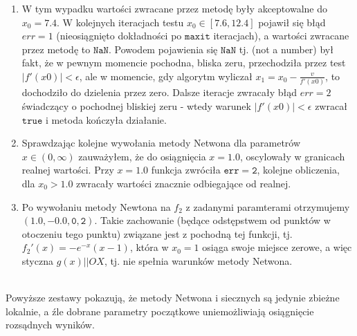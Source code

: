 \begin{enumerate}
  \item W tym wypadku wartości zwracane przez metodę były akceptowalne do $ x_0 = 7.4 $. W kolejnych iteracjach testu $x_0 \in [7.6, 12.4] $ pojawił się błąd $ err = 1 $ (nieosiągnięto dokładności po $\mathtt{maxit}$ iteracjach), a wartości zwracane przez metodę to $ \mathtt{NaN} $. Powodem pojawienia się $ \mathtt{NaN} $ tj. (not a number) był fakt, że w pewnym momencie pochodna, bliska zeru, przechodziła przez test $|f'(x0)| < \epsilon $, ale w momencie, gdy algorytm wyliczał $ x_1 = x_0 - \frac{v}{f'(x0)} $, to dochodziło do dzielenia przez zero. Dalsze iteracje zwracały błąd $ err = 2$ świadczący o pochodnej bliskiej zeru - wtedy warunek $|f'(x0)| < \epsilon $ zwracał  $\mathtt{true}$ i metoda kończyła działanie.

  \item Sprawdzając kolejne wywołania metody Netwona dla parametrów $ x \in (0, \infty) $ zauważyłem, że do osiągnięcia $ x = 1.0 $, oscylowały w granicach realnej wartości. Przy $ x  = 1.0 $ funkcja zwróciła $ \mathtt{err = 2} $, kolejne obliczenia, dla $ x_0 > 1.0 $ zwracały wartości znacznie odbiegające od realnej.

  \item Po wywołaniu metody Newtona na $ f_2 $ z zadanymi paramterami otrzymujemy $ \mathtt{(1.0, -0.0, 0, 2)} $. Takie zachowanie (będące odstępstwem od punktów w otoczeniu tego punktu) związane jest z pochodną tej funkcji, tj. $ f_{2}'(x) = -e^{-x}(x - 1)$, która w $ x_0 = 1 $ osiąga swoje miejsce zerowe, a więc styczna $g(x) || OX$, tj. nie spełnia warunków metody Netwona.

\end{enumerate}
\ \\
Powyższe zestawy pokazują, że metody Netwona i siecznych są jedynie zbieżne lokalnie, a źle dobrane parametry początkowe uniemożliwiają osiągnięcie rozsądnych wyników. 

